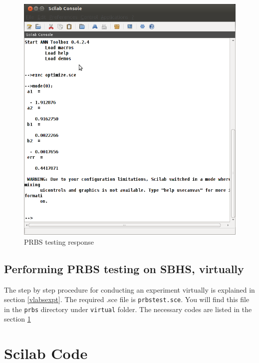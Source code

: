 \begin{figure}
\centering
\includegraphics[width=0.7\linewidth]{prbs/prbs-model.png}
\caption{PRBS testing response}
\label{prbs-model}
\end{figure}



\subsection{Performing PRBS testing on SBHS, virtually}
The step by step procedure for conducting an experiment virtually is explained in section \ref{vlabsexpt}. The required .sce file is {\tt prbstest.sce}.  You will find this file in the {\tt prbs} directory under {\tt virtual} folder. The necessary codes are listed in the section \ref{prbscodes}


\section{Scilab Code}\label{prbscodes}
\begin{code}

\end{code}

\begin{code}

\end{code}


\begin{code}

\end{code}


\begin{code}

\end{code}


% 
